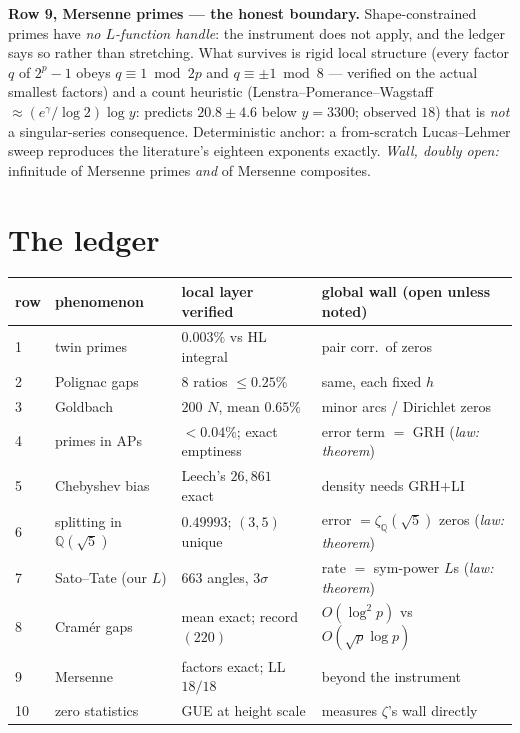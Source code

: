 \documentclass[11pt]{article}
\newcommand{\KK}{\mathbb{Q}(\sqrt5)}
\theoremstyle{remark}
\begin{document}
\textbf{Row 9, Mersenne primes --- the honest boundary.} Shape-constrained
primes have \emph{no $L$-function handle}: the instrument does not apply,
and the ledger says so rather than stretching. What survives is rigid local
structure (every factor $q$ of $2^p-1$ obeys $q\equiv1\bmod 2p$ and
$q\equiv\pm1\bmod 8$ --- verified on the actual smallest factors) and a
count heuristic (Lenstra--Pomerance--Wagstaff
$\approx(e^\gamma/\log2)\log y$: predicts $20.8\pm4.6$ below $y=3300$;
observed $18$) that is \emph{not} a singular-series consequence.
Deterministic anchor: a from-scratch Lucas--Lehmer sweep reproduces the
literature's eighteen exponents exactly. \emph{Wall, doubly open:}
infinitude of Mersenne primes \emph{and} of Mersenne composites.

\section{The ledger}

\begin{center}
\small
\begin{tabular}{@{}llll@{}}
\toprule
row & phenomenon & local layer verified & global wall (open unless noted) \\
\midrule
1 & twin primes & $0.003\%$ vs HL integral & pair corr.\ of zeros \\
2 & Polignac gaps & $8$ ratios $\le0.25\%$ & same, each fixed $h$ \\
3 & Goldbach & $200$ $N$, mean $0.65\%$ & minor arcs / Dirichlet zeros \\
4 & primes in APs & $<0.04\%$; exact emptiness & error term $=$ GRH
(\emph{law: theorem}) \\
5 & Chebyshev bias & Leech's $26{,}861$ exact & density needs GRH$+$LI \\
6 & splitting in $\KK$ & $0.49993$; $(3,5)$ unique & error $=\zeta_\KK$ zeros
(\emph{law: theorem}) \\
7 & Sato--Tate (our $L$) & $663$ angles, $3\sigma$ & rate $=$ sym-power $L$s
(\emph{law: theorem}) \\
8 & Cram\'er gaps & mean exact; record $(220)$ & $O(\log^2p)$ vs
$O(\sqrt p\log p)$ \\
9 & Mersenne & factors exact; LL $18/18$ & beyond the instrument \\
10 & zero statistics & GUE at height scale & measures $\zeta$'s wall directly \\
\bottomrule
\end{tabular}
\end{center}
\end{document}
